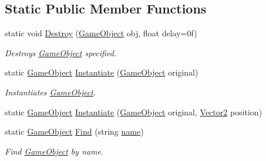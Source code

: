 \subsection*{Static Public Member Functions}
\begin{DoxyCompactItemize}
\item 
static void \mbox{\hyperlink{class_retro_engine_1_1_game_object_aaa4f2fd2552c30c17dd68c0cd3d4a787}{Destroy}} (\mbox{\hyperlink{class_retro_engine_1_1_game_object}{Game\+Object}} obj, float delay=0f)
\begin{DoxyCompactList}\small\item\em Destroys \mbox{\hyperlink{class_retro_engine_1_1_game_object}{Game\+Object}} specified. \end{DoxyCompactList}\item 
static \mbox{\hyperlink{class_retro_engine_1_1_game_object}{Game\+Object}} \mbox{\hyperlink{class_retro_engine_1_1_game_object_ad94d117d650784cdcc2421bcba8eaf63}{Instantiate}} (\mbox{\hyperlink{class_retro_engine_1_1_game_object}{Game\+Object}} original)
\begin{DoxyCompactList}\small\item\em Instantiates \mbox{\hyperlink{class_retro_engine_1_1_game_object}{Game\+Object}}. \end{DoxyCompactList}\item 
static \mbox{\hyperlink{class_retro_engine_1_1_game_object}{Game\+Object}} \mbox{\hyperlink{class_retro_engine_1_1_game_object_ad2b9d968a8be8c0ac5ae601960b18d8d}{Instantiate}} (\mbox{\hyperlink{class_retro_engine_1_1_game_object}{Game\+Object}} original, \mbox{\hyperlink{struct_retro_engine_1_1_vector2}{Vector2}} position)
\item 
static \mbox{\hyperlink{class_retro_engine_1_1_game_object}{Game\+Object}} \mbox{\hyperlink{class_retro_engine_1_1_game_object_af51aa35d2f42bf89158f80f457376e32}{Find}} (string \mbox{\hyperlink{class_retro_engine_1_1_game_object_aca939760b5e1dca14f075609013646e7}{name}})
\begin{DoxyCompactList}\small\item\em Find \mbox{\hyperlink{class_retro_engine_1_1_game_object}{Game\+Object}} by name. \end{DoxyCompactList}\end{DoxyCompactItemize}
